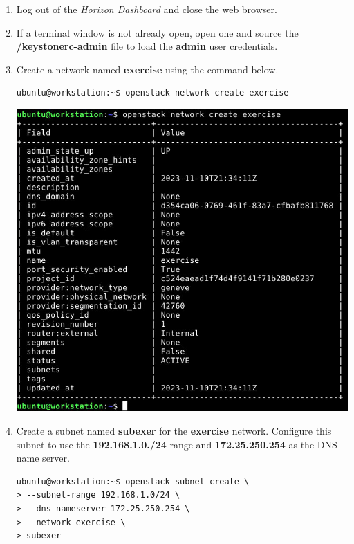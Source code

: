 \documentclass[letterpaper, 12pt]{article}
\begin{document}
\begin{enumerate}
    \item Log out of the \textit{Horizon Dashboard} and close the web browser.
    
    \item If a terminal window is not already open, open one and source the \textbf{\texttildemid/keystonerc-admin} file
    to load the \textbf{admin} user credentials.
    
    \item Create a network named \textbf{exercise} using the command below.
\begin{lstlisting}
ubuntu@workstation:~$ openstack network create exercise
\end{lstlisting}

    \begin{center}
        \includegraphics[width=\linewidth]{images/part3/step7.png}
    \end{center}

    \item Create a subnet named \textbf{subexer} for the \textbf{exercise} network. Configure this subnet to use the
    \textbf{192.168.1.0./24} range and \textbf{172.25.250.254} as the DNS name server.
\begin{lstlisting}
ubuntu@workstation:~$ openstack subnet create \
> --subnet-range 192.168.1.0/24 \
> --dns-nameserver 172.25.250.254 \
> --network exercise \
> subexer
\end{lstlisting}


\end{enumerate}
\end{document}
